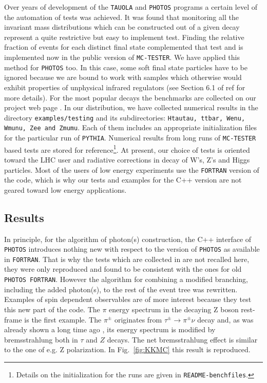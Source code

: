 \documentclass[]{Photos_interface_design}
\begin{document}
Over years of development of the {\tt TAUOLA} and {\tt PHOTOS} programs a certain level 
of the automation of tests was achieved. It was found that monitoring all the invariant mass distributions which can be constructed out of a given decay represent 
a quite restrictive but easy to implement test.
Finding the relative fraction of events for each distinct final state 
 complemented that test and is implemented now in the public version of {\tt MC-TESTER}. 
We have applied this method 
for {\tt PHOTOS} too. In this case, some soft final state particles have to be ignored because we are bound to  work with  samples which otherwise would
exhibit properties of unphysical infrared regulators (see Section 6.1 of 
ref \cite{Davidson:2008ma} for more details). For the most popular 
decays the benchmarks are collected on our project web page \cite{Photos_tests}.
In our distribution, we have collected numerical results in the directory
{\tt examples/testing} and its subdirectories:  
{\tt Htautau, ttbar, Wenu, Wmunu, Zee and Zmumu}. Each of them includes
an appropriate initialization files for the particular run of {\tt PYTHIA}. Numerical results from long runs of {\tt MC-TESTER} based tests
are stored for reference\footnote{Details on the initialization for the 
runs are given in 
{\tt README-benchfiles}.}. At present, our choice of tests is oriented toward 
the LHC user and radiative corrections in decay of W's, Z's and Higgs particles.
Most of the users of low energy experiments use the {\tt FORTRAN} version 
of the code, which is why our tests and examples for the C++ version are not geared toward 
low energy applications.


\subsection{Results}
\label{sec:results}
In principle, for the algorithm of  photon(s) construction, the C++ interface of
{\tt PHOTOS} introduces nothing new with respect to the 
version of {\tt PHOTOS} as available in {\tt FORTRAN}.
That is why the  tests which are collected in \cite{Photos_tests} are not
recalled here, they were only reproduced and found to be consistent with the ones for
old {\tt PHOTOS FORTRAN}.
However the algorithm for combining a modified branching, including the added 
photon(s), to the rest of the event tree was rewritten.
Examples of spin dependent observables are of more interest because they test this new part of the code.
The $\pi$ energy spectrum in the decaying
Z boson rest-frame is the first example. 
The $\pi^\pm$ originates from $\tau^\pm \to \pi^\pm \nu $ decay and, 
as was already shown a long time ago \cite{Boillot:1988re}, its energy spectrum is modified by bremsstrahlung both in $\tau$ and $Z$ decays. The net
bremsstrahlung  effect is similar to the one of e.g. Z polarization. In Fig.~\ref{fig:KKMC} this result is reproduced.
\end{document}
